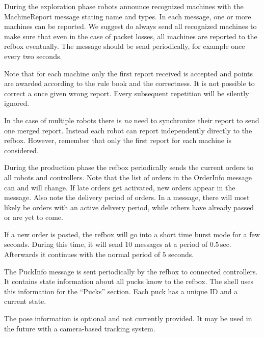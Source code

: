 \documentclass[a4paper]{article}
\begin{document}
%
{%
  During the exploration phase robots announce recognized machines
  with the MachineReport message stating name and types. In each
  message, one or more machines can be reported. We suggest do always
  send all recognized machines to make sure that even in the case of
  packet losses, all machines are reported to the refbox
  eventually. The message should be send periodically, for example
  once every two seconds.

  \medskip

  Note that for each machine only the first report received is
  accepted and points are awarded according to the rule book and the
  correctness. It is not possible to correct a once given wrong
  report. Every subsequent repetition will be silently ignored.

  \medskip

  In the case of multiple robots there is \emph{no} need to
  synchronize their report to send one merged report. Instead each
  robot can report independently directly to the refbox. However,
  remember that only the first report for each machine is considered.

}

%
{%
  During the production phase the refbox periodically sends the
  current orders to all robots and controllers. Note that the list of
  orders in the OrderInfo message can and will change. If late orders
  get activated, new orders appear in the message. Also note the
  delivery period of orders. In a message, there will most likely be
  orders with an active delivery period, while others have already
  passed or are yet to come.

  \medskip

  If a new order is posted, the refbox will go into a short time burst
  mode for a few seconds. During this time, it will send 10 messages
  at a period of $0.5$\,sec. Afterwards it continues with the normal
  period of $5$ seconds.
}

%
{%
  The PuckInfo message is sent periodically by the refbox to connected
  controllers. It contains state information about all pucks know to
  the refbox. The shell uses this information for the ``Pucks''
  section. Each puck has a unique ID and a current state.

  \medskip

  The pose information is optional and not currently provided. It may
  be used in the future with a camera-based tracking system.
}
\end{document}
